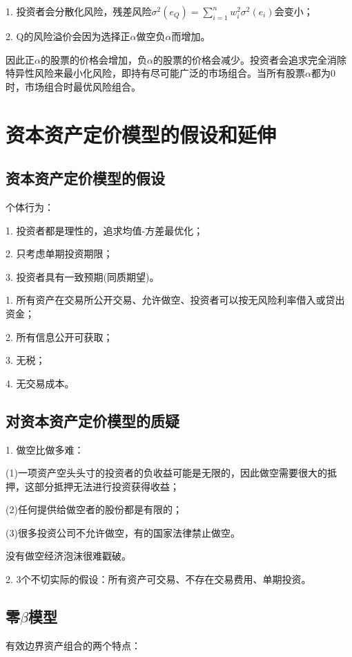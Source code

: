\documentclass{article}
\begin{document}
1. 投资者会分散化风险，残差风险$ \sigma^2(e_Q)=\sum_{i=1}^{n}w_i^2\sigma^2(e_i) $会变小；

2. Q的风险溢价会因为选择正$ \alpha $做空负$ \alpha $而增加。

因此正$ \alpha $的股票的价格会增加，负$ \alpha $的股票的价格会减少。投资者会追求完全消除特异性风险来最小化风险，即持有尽可能广泛的市场组合。当所有股票$ \alpha $都为0时，市场组合时最优风险组合。

\section{资本资产定价模型的假设和延伸}
\subsection{资本资产定价模型的假设}
个体行为：

1. 投资者都是理性的，追求均值-方差最优化；

2. 只考虑单期投资期限；

3. 投资者具有一致预期(同质期望)。

\hspace*{\fill}

1. 所有资产在交易所公开交易、允许做空、投资者可以按无风险利率借入或贷出资金；

2. 所有信息公开可获取；

3. 无税；

4. 无交易成本。

\subsection{对资本资产定价模型的质疑}
1. 做空比做多难：

(1)一项资产空头头寸的投资者的负收益可能是无限的，因此做空需要很大的抵押，这部分抵押无法进行投资获得收益；

(2)任何提供给做空者的股份都是有限的；

(3)很多投资公司不允许做空，有的国家法律禁止做空。

没有做空经济泡沫很难戳破。

\hspace*{\fill}

2. 3个不切实际的假设：所有资产可交易、不存在交易费用、单期投资。

\subsection{零$ \beta $模型}
有效边界资产组合的两个特点：
\end{document}
